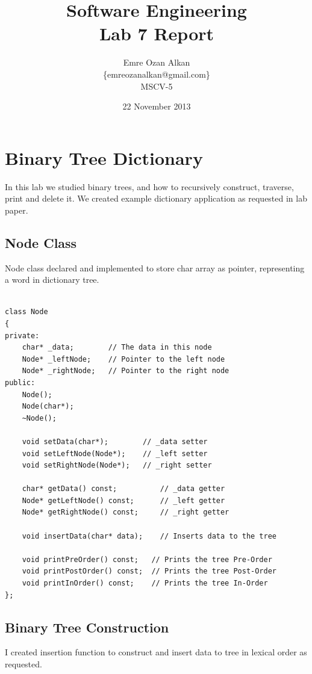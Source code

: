 \documentclass{article}
\title{Software Engineering\\
		Lab 7 Report}
\author{Emre Ozan Alkan\\
		\{emreozanalkan@gmail.com\}\\
		MSCV-5}
\date{22 November 2013}
\begin{document}
\maketitle

\section{Binary Tree Dictionary}
	In this lab we studied binary trees, and how to recursively construct, traverse, print and delete it. We created example dictionary application as requested in lab paper.

	\subsection{Node Class}
	Node class declared and implemented to store char array as pointer, representing a word in dictionary tree.
	
	\begin{lstlisting}[label=Node-h, caption=Node.h]
	
class Node
{
private:
    char* _data;        // The data in this node
    Node* _leftNode;    // Pointer to the left node
    Node* _rightNode;   // Pointer to the right node
public:
    Node();
    Node(char*);
    ~Node();

    void setData(char*);        // _data setter
    void setLeftNode(Node*);    // _left setter
    void setRightNode(Node*);   // _right setter

    char* getData() const;          // _data getter
    Node* getLeftNode() const;      // _left getter
    Node* getRightNode() const;     // _right getter

    void insertData(char* data);    // Inserts data to the tree

    void printPreOrder() const;   // Prints the tree Pre-Order
    void printPostOrder() const;  // Prints the tree Post-Order
    void printInOrder() const;    // Prints the tree In-Order
};

	\end{lstlisting}
	
	
	\subsection{Binary Tree Construction}
	I created insertion function to construct and insert data to tree in lexical order as requested.
	
\end{document}

